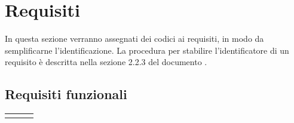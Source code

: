 \section{Requisiti}

In questa sezione verranno assegnati dei codici ai requisiti, in modo da semplificarne l'identificazione. La procedura per stabilire l'identificatore di un requisito è descritta nella sezione 2.2.3 del documento \docNameVersionNdP{}.
\subsection{Requisiti funzionali}


\begin{center}
\renewcommand{\arraystretch}{2.2}

\begin{longtable}{cm{8cm}c }
	
	\rowcolor[HTML]{232f3e}


\end{longtable}
\end{center}

